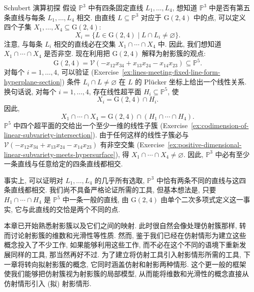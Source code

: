 \begin{Example}{Schubert 演算初探}\leavevmode\label{ex:lines-meeting-four-fixed-projective-lines}
假设 $\mathbb{P}^{3}$ 中有四条固定直线 $L_{1},\ldots,L_{4}$, 想知道 $\mathbb{P}^{3}$ 中是否有第五条直线与每条 $L_{1},\ldots,L_{4}$ 相交. 由直线 $L\subseteq\mathbb{P}^{3}$ 对应于 $\mathrm{G}(2,4)$ 中的点, 可以定义四个子集 $X_{1},\ldots,X_{4}\subseteq\mathrm{G}(2,4)$:
\[
  X_{i}=\{L\in\mathrm{G}(2,4)\mid L\cap L_{i}\ne\varnothing\}.
\]
注意, 与每条 $L_{i}$ 相交的直线必在交集 $X_{1}\cap\cdots\cap X_{4}$ 中. 因此, 我们想知道 $X_{1}\cap\cdots\cap X_{4}$ 是否非空. 现在利用把 $\mathrm{G}(2,4)$ 解释为射影簇的观点:
\[
  \mathrm{G}(2,4)=\mathcal{V}(-x_{12}x_{34}+x_{13}x_{24}-x_{14}x_{23})
  \subseteq\mathbb{P}^{5}.
\]
对每个 $i=1,\ldots,4$, 可以验证 (Exercise~\ref{ex:lines-meeting-fixed-line-form-hyperplane-section}) 条件 $L_{i}\cap L\ne\varnothing$ 在 $L$ 的 Plücker 坐标上给出一个线性关系. 换句话说, 对每个 $i=1,\ldots,4$, 存在线性超平面 $H_{i}\subseteq\mathbb{P}^{5}$, 使
\[
  X_{i}=\mathrm{G}(2,4)\cap H_{i}.
\]
因此,
\[
  X_{1}\cap\cdots\cap X_{4}=\mathrm{G}(2,4)\cap(H_{1}\cap\cdots\cap H_{4}).
\]
$\mathbb{P}^{5}$ 中四个超平面的交给出一个至少一维的线性子簇 (Exercise~\ref{ex:codimension-of-linear-subvariety-intersection}). 由于任何这样的线性子簇必与 $\mathcal{V}(-x_{12}x_{34}+x_{13}x_{24}-x_{14}x_{23})$ 有非空交集 (Exercise~\ref{ex:positive-dimensional-linear-subvariety-meets-hypersurface}), 得 $X_{1}\cap\cdots\cap X_{4}\ne\varnothing$. 因此, $\mathbb{P}^{3}$ 中必有至少一条直线与任意给定的四条直线都相交.

事实上, 可以证明对 $L_{1},\ldots,L_{4}$ 的\textquotedbl{}几乎所有\textquotedbl{}选取, $\mathbb{P}^{3}$ 中恰有两条不同的直线与这四条直线都相交. 我们尚不具备严格论证所需的工具, 但基本想法是, 只要 $H_{1}\cap\cdots\cap H_{4}$ 是 $\mathbb{P}^{5}$ 中一条\textquotedbl{}一般的\textquotedbl{}直线, 由 $\mathrm{G}(2,4)$ 由单个二次多项式定义这一事实, 它与此直线的交恰是两个不同的点.
\end{Example}

本章已开始熟悉射影簇以及它们之间的映射. 此时很自然会像处理仿射簇那样, 转而讨论射影簇的维数和光滑性等性质. 然而, 鉴于我们已经在仿射情形为建立这些概念投入了不少工作, 如果能够利用这些工作, 而不必在这个不同的语境下重新发展同样的工具, 那当然再好不过. 为了建立将仿射工具引入射影情形所需的工具, 下一章将转向拟射影簇的概念, 它同时涵盖仿射和射影两种情形. 这个更一般的框架使我们能够把仿射簇视为射影簇的局部模型, 从而能将维数和光滑性的概念直接从仿射情形引入 (拟) 射影情形.

